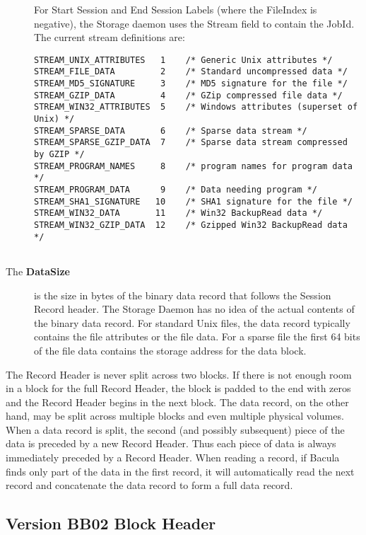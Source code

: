 \begin{description}
For Start Session and End Session Labels (where the FileIndex is negative), 
the Storage daemon uses the Stream field to contain the JobId.  The current
stream definitions are:  

\footnotesize
\begin{verbatim}
STREAM_UNIX_ATTRIBUTES   1    /* Generic Unix attributes */
STREAM_FILE_DATA         2    /* Standard uncompressed data */
STREAM_MD5_SIGNATURE     3    /* MD5 signature for the file */
STREAM_GZIP_DATA         4    /* GZip compressed file data */
STREAM_WIN32_ATTRIBUTES  5    /* Windows attributes (superset of Unix) */
STREAM_SPARSE_DATA       6    /* Sparse data stream */
STREAM_SPARSE_GZIP_DATA  7    /* Sparse data stream compressed by GZIP */
STREAM_PROGRAM_NAMES     8    /* program names for program data */
STREAM_PROGRAM_DATA      9    /* Data needing program */
STREAM_SHA1_SIGNATURE   10    /* SHA1 signature for the file */
STREAM_WIN32_DATA       11    /* Win32 BackupRead data */
STREAM_WIN32_GZIP_DATA  12    /* Gzipped Win32 BackupRead data */
   
\end{verbatim}
\normalsize

\item [The {\bf DataSize} ]
   is the size in bytes of the binary data  record that follows the Session
Record header. The Storage Daemon  has no idea of the actual contents of the
binary data record. For  standard Unix files, the data record typically
contains the file  attributes or the file data. For a sparse file  the first
64 bits of the file data contains the storage  address for the data block. 
\end{description}

The Record Header is never split across two blocks. If there is not enough
room in a block for the full Record Header, the block is padded to the end
with zeros and the Record Header begins in the next block. The data record, on
the other hand, may be split across multiple blocks and even multiple physical
volumes. When a data record is split, the second (and possibly subsequent)
piece of the data is preceded by a new Record Header. Thus each piece of data
is always immediately preceded by a Record Header. When reading a record, if
Bacula finds only part of the data in the first record, it will automatically
read the next record and concatenate the data record to form a full data
record. 

\subsection*{Version BB02 Block Header}

